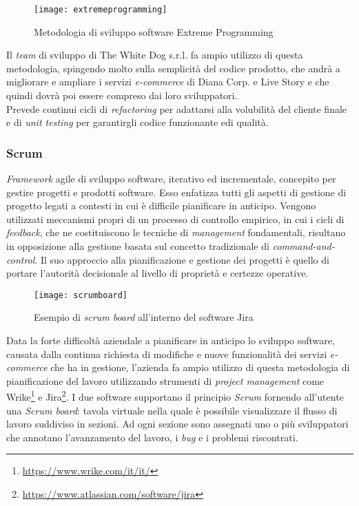 \label{Extreme Programming}
\begin{figure}[ht]
	\begin{center}
		\texttt{[image: extremeprogramming]}
		\caption{Metodologia di sviluppo software Extreme Programming}
	\end{center}
\end{figure}
\FloatBarrier

Il \textit{team} di sviluppo di The White Dog s.r.l. fa ampio utilizzo di questa metodologia, spingendo molto sulla semplicità del codice prodotto, che andrà a migliorare e ampliare i servizi \textit{e-commerce} di Diana Corp. e Live Story e che quindi dovrà poi essere compreso dai loro sviluppatori. \\
Prevede continui cicli di \textit{refactoring} per adattarsi alla volubilità del cliente finale e di \textit{unit testing} per garantirgli codice funzionante edi qualità.

\subsubsection{Scrum}

\textit{Framework} agile di sviluppo software, iterativo ed incrementale, concepito per gestire progetti e prodotti software. Esso enfatizza tutti gli aspetti di gestione di progetto legati a contesti in cui è difficile pianificare in anticipo. Vengono utilizzati meccanismi propri di un processo di controllo empirico, in cui i cicli di \textit{feedback}, che ne costituiscono le tecniche di \textit{management} fondamentali, risultano in opposizione alla gestione basata sul concetto tradizionale di \textit{command-and-control}. Il suo approccio alla pianificazione e gestione dei progetti è quello di portare l'autorità decisionale al livello di proprietà e certezze operative.

\label{Scrum board}
\begin{figure}[ht]
	\begin{center}
		\texttt{[image: scrumboard]}
		\caption{Esempio di \textit{scrum board} all'interno del software Jira}
	\end{center}
\end{figure}
\FloatBarrier

Data la forte difficoltà aziendale a pianificare in anticipo lo sviluppo software, causata dalla continua richiesta di modifiche e nuove funzionalità dei servizi \textit{e-commerce} che ha in gestione, l'azienda fa ampio utilizzo di questa metodologia di pianificazione del lavoro utilizzando strumenti di \textit{project management} come Wrike\footnote[4]{\url{https://www.wrike.com/it/it/}} e Jira\footnote[5]{\url{https://www.atlassian.com/software/jira}}. I due software supportano il principio \textit{Scrum} fornendo all'utente una \textit{Scrum board}: tavola virtuale nella quale è possibile visualizzare il flusso di lavoro suddiviso in sezioni. Ad ogni sezione sono assegnati uno o più sviluppatori che annotano l'avanzamento del lavoro, i \textit{bug} e i problemi riscontrati. 

